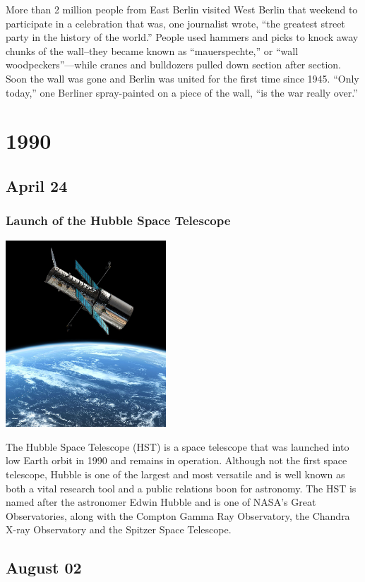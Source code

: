 \documentclass[11pt]{report}
\begin{document}
More than 2 million people from East Berlin visited West Berlin that weekend to participate in a celebration that was, one journalist wrote, “the greatest street party in the history of the world.” People used hammers and picks to knock away chunks of the wall–they became known as “mauerspechte,” or “wall woodpeckers”—while cranes and bulldozers pulled down section after section. Soon the wall was gone and Berlin was united for the first time since 1945. “Only today,” one Berliner spray-painted on a piece of the wall, “is the war really over.”

\chapter{1990}
\section{April 24}
\subsection{Launch of the Hubble Space Telescope}
\vspace{2mm}\begin{center}\includegraphics[width=6cm]{./img/hubble.jpg}\end{center}
The Hubble Space Telescope (HST) is a space telescope that was launched into low Earth orbit in 1990 and remains in operation. Although not the first space telescope, Hubble is one of the largest and most versatile and is well known as both a vital research tool and a public relations boon for astronomy. The HST is named after the astronomer Edwin Hubble and is one of NASA's Great Observatories, along with the Compton Gamma Ray Observatory, the Chandra X-ray Observatory and the Spitzer Space Telescope.

\section{August 02}
\end{document}

